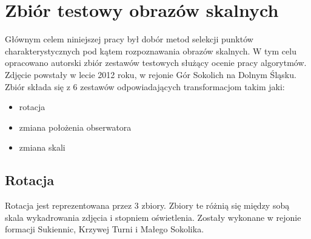\chapter{Zbiór testowy obrazów skalnych}
Głównym celem niniejszej pracy był dobór metod selekcji punktów charakterystycznych pod kątem rozpoznawania obrazów skalnych. W tym celu opracowano autorski zbiór zestawów testowych służący ocenie pracy algorytmów. Zdjęcie powstały w lecie 2012 roku, w rejonie Gór Sokolich na Dolnym Śląsku. Zbiór składa się z 6 zestawów odpowiadających transformacjom takim jaki:
\begin{itemize}
\item rotacja
\item zmiana położenia obserwatora
\item zmiana skali
\end{itemize}
\FloatBarrier
\newpage
\section{Rotacja}
Rotacja jest reprezentowana przez 3 zbiory. Zbiory te różnią się między sobą skala wykadrowania zdjęcia i stopniem oświetlenia. Zostały wykonane w rejonie formacji Sukiennic, Krzywej Turni i Małego Sokolika.
\FloatBarrier
